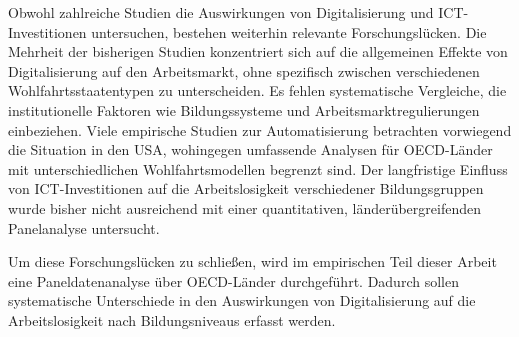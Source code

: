 Obwohl zahlreiche Studien die Auswirkungen von Digitalisierung und \ac{ICT}-Investitionen 
untersuchen, bestehen weiterhin relevante Forschungslücken. Die Mehrheit der bisherigen 
Studien konzentriert sich auf die allgemeinen Effekte von Digitalisierung auf den 
Arbeitsmarkt, ohne spezifisch zwischen verschiedenen Wohlfahrtsstaatentypen zu 
unterscheiden. Es fehlen systematische Vergleiche, die institutionelle Faktoren wie 
Bildungssysteme und Arbeitsmarktregulierungen einbeziehen. Viele empirische Studien zur 
Automatisierung betrachten vorwiegend die Situation in den USA, wohingegen umfassende 
Analysen für \ac{OECD}-Länder mit unterschiedlichen Wohlfahrtsmodellen begrenzt sind. Der 
langfristige Einfluss von \ac{ICT}-Investitionen auf die Arbeitslosigkeit verschiedener 
Bildungsgruppen wurde bisher nicht ausreichend mit einer quantitativen, 
länderübergreifenden Panelanalyse untersucht.

Um diese Forschungslücken zu schließen, wird im empirischen Teil dieser Arbeit eine 
Paneldatenanalyse über \ac{OECD}-Länder durchgeführt. Dadurch sollen systematische 
Unterschiede in den Auswirkungen von Digitalisierung auf die Arbeitslosigkeit nach 
Bildungsniveaus erfasst werden.
